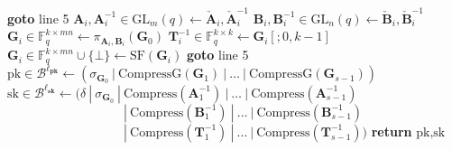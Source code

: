 \begin{algorithm}[H]
\begin{algorithmic}[1]
        \State \textbf{goto} line 5
    \EndIf
    \State $\textbf{A}_i, \textbf{A}_i^{-1} \in \text{GL}_m(q) \gets \check{\textbf{A}}_i, \check{\textbf{A}}_i^{-1}$
    \State $\textbf{B}_i, \textbf{B}_i^{-1} \in \text{GL}_n(q) \gets \check{\textbf{B}}_i, \check{\textbf{B}}_i^{-1}$
    \State $\textbf{G}_i \in \mathds{F}_q^{k \times mn} \gets \pi_{\textbf{A}_i, \textbf{B}_i}(\textbf{G}_0)$
    \State $\textbf{T}_i^{-1} \in \mathds{F}_q^{k \times k} \gets \textbf{G}_i[;0,k-1]$
    \State $\textbf{G}_i \in \mathds{F}_q^{k \times mn} \cup \{\bot\} \gets \text{SF}(\textbf{G}_i)$
        \State \textbf{goto} line 5
    \EndIf
    \EndFor
\State $\text{pk} \in \mathcal{B}^{\ell_\textbf{pk}} \gets (\sigma_{\textbf{G}_0}~|~\text{CompressG}(\textbf{G}_1)~|~\ldots~|~\text{CompressG}(\textbf{G}_{s-1}))$
\State $\text{sk} \in \mathcal{B}^{\ell_\textbf{sk}} \gets (\delta~|~\sigma_{\textbf{G}_0}~|~\text{Compress}(\textbf{A}_1^{-1})~|~\ldots~|~\text{Compress}(\textbf{A}_{s-1}^{-1})$\\
$\quad\quad\quad\quad\quad\quad\quad\quad\quad~|~\text{Compress}(\textbf{B}_1^{-1})~|~\ldots~|~\text{Compress}(\textbf{B}_{s-1}^{-1})$\\
$\quad\quad\quad\quad\quad\quad\quad\quad\quad~|~\text{Compress}(\textbf{T}_1^{-1})~|~\ldots~|~\text{Compress}(\textbf{T}_{s-1}^{-1}))$
\State \textbf{return} $\text{pk}, \text{sk}$
\end{algorithmic}
\end{algorithm}

\newpage

